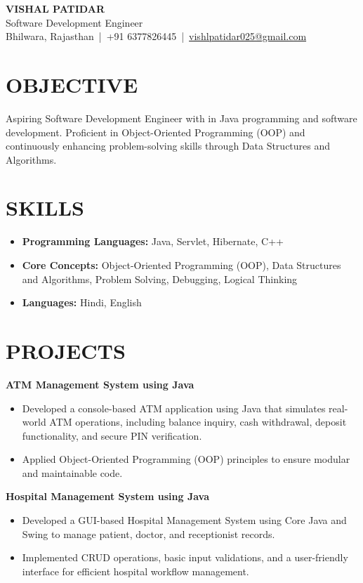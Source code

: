 \documentclass[11pt,a4paper]{article}
\begin{document}
\begin{center}
    {\LARGE \textbf{VISHAL PATIDAR}}\\
    Software Development Engineer\\
    Bhilwara, Rajasthan \,|\, +91 6377826445 \,|\, \href{mailto:vishlpatidar025@gmail.com}{vishlpatidar025@gmail.com}
\end{center}

\section*{OBJECTIVE}
Aspiring Software Development Engineer with in Java programming and software development. Proficient in Object-Oriented Programming (OOP) and continuously enhancing problem-solving skills through Data Structures and Algorithms.

\section*{SKILLS}
\begin{itemize}[leftmargin=*]
    \item \textbf{Programming Languages:} Java, Servlet, Hibernate, C++
    \item \textbf{Core Concepts:} Object-Oriented Programming (OOP), Data Structures and Algorithms, Problem Solving, Debugging, Logical Thinking
    \item \textbf{Languages:} Hindi, English
\end{itemize}

\section*{PROJECTS}

\noindent\textbf{ATM Management System using Java}
\begin{itemize}
  \item Developed a console-based ATM application using Java that simulates real-world ATM operations, including balance inquiry, cash withdrawal, deposit functionality, and secure PIN verification.
  \item Applied Object-Oriented Programming (OOP) principles to ensure modular and maintainable code.
\end{itemize}

\noindent\textbf{Hospital Management System using Java}
\begin{itemize}
  \item Developed a GUI-based Hospital Management System using Core Java and Swing to manage patient, doctor, and receptionist records.
  \item Implemented CRUD operations, basic input validations, and a user-friendly interface for efficient hospital workflow management.
\end{itemize}
\end{document}
